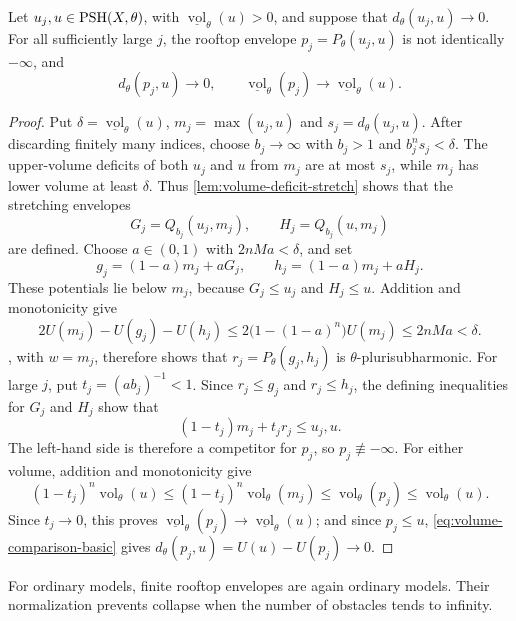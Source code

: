 \begin{proposition}\label{prop:volume-rooftop-continuity}
Let $u_j,u\in\mathrm{PSH}(X,\theta)$, with $\underline{\operatorname{vol}}_\theta(u)>0$, and suppose that $d_\theta(u_j,u)\to0$. For all sufficiently large $j$, the rooftop envelope $p_j=P_\theta(u_j,u)$ is not identically $-\infty$, and
\[
 d_\theta(p_j,u)\longrightarrow0,\qquad
 \underline{\operatorname{vol}}_\theta(p_j)
       \longrightarrow\underline{\operatorname{vol}}_\theta(u).
\]
\end{proposition}
\begin{proof}
Put $\delta=\underline{\operatorname{vol}}_\theta(u)$, $m_j=\max(u_j,u)$ and $s_j=d_\theta(u_j,u)$. After discarding finitely many indices, choose $b_j\to\infty$ with $b_j>1$ and $b_j^ns_j<\delta$. The upper-volume deficits of both $u_j$ and $u$ from $m_j$ are at most $s_j$, while $m_j$ has lower volume at least $\delta$. Thus \cref{lem:volume-deficit-stretch} shows that the stretching envelopes
\[
 G_j=Q_{b_j}(u_j,m_j),\qquad H_j=Q_{b_j}(u,m_j)
\]
are defined. Choose $a\in(0,1)$ with $2nMa<\delta$, and set
\[
 g_j=(1-a)m_j+aG_j,\qquad h_j=(1-a)m_j+aH_j.
\]
These potentials lie below $m_j$, because $G_j\leq u_j$ and $H_j\leq u$. Addition and monotonicity give
\[
 2U(m_j)-U(g_j)-U(h_j)
 \leq2\bigl(1-(1-a)^n\bigr)U(m_j)
 \leq2nMa<\delta.
\]
, with $w=m_j$, therefore shows that $r_j=P_\theta(g_j,h_j)$ is $\theta$-plurisubharmonic. For large $j$, put $t_j=(ab_j)^{-1}<1$. Since $r_j\leq g_j$ and $r_j\leq h_j$, the defining inequalities for $G_j$ and $H_j$ show that
\[
 (1-t_j)m_j+t_jr_j\leq u_j,u.
\]
The left-hand side is therefore a competitor for $p_j$, so $p_j\not\equiv-\infty$. For either volume, addition and monotonicity give
\[
 (1-t_j)^n\operatorname{vol}_\theta(u)
 \leq(1-t_j)^n\operatorname{vol}_\theta(m_j)
 \leq\operatorname{vol}_\theta(p_j)
 \leq\operatorname{vol}_\theta(u).
\]
Since $t_j\to0$, this proves $\underline{\operatorname{vol}}_\theta(p_j)\to\underline{\operatorname{vol}}_\theta(u)$; and since $p_j\leq u$, \eqref{eq:volume-comparison-basic} gives $d_\theta(p_j,u)=U(u)-U(p_j)\to0$.
\end{proof}

For ordinary models, finite rooftop envelopes are again ordinary models. Their normalization prevents collapse when the number of obstacles tends to infinity.

